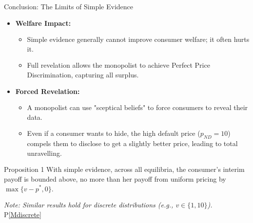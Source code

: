 \documentclass{beamer}
\begin{document}
    \begin{frame}{Conclusion: The Limits of Simple Evidence}
        \begin{itemize}
            \setlength\itemsep{1em}
            \item \textbf{Welfare Impact:} 
            \begin{itemize}
                \item Simple evidence generally cannot improve consumer welfare; it often hurts it.
                \item Full revelation allows the monopolist to achieve Perfect Price Discrimination, capturing all surplus.
            \end{itemize}
            
            \item \textbf{Forced Revelation:}
            \begin{itemize}
                \item A monopolist can use "sceptical beliefs" to force consumers to reveal their data.
                \item Even if a consumer wants to hide, the high default price ($p_{ND}=10$) compels them to disclose to get a slightly better price, leading to total unravelling.
            \end{itemize}
        \end{itemize}
    
        \begin{block}{Proposition 1}
            With simple evidence, across all equilibria, the consumer's interim payoff is bounded above, no more than her payoff from uniform pricing by $\max\{v - p^*, 0\}$.\cite{10.1093/restud/rdac033}
        \end{block}
    
        \vspace{0.2cm}
        \footnotesize{\textit{Note: Similar results hold for discrete distributions (e.g., $v \in \{1, 10\}$).} P\ref{Mdiscrete}}
    \end{frame}
\end{document}
